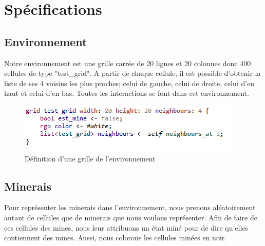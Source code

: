 \chapter{Spécifications}



\section{Environnement}

Notre environnement est une grille carrée de 20 lignes et 20 colonnes donc 400 cellules de type "test\_grid". A partir de chaque cellule, il est possible d'obtenir la liste de ses 4 voisins les plus proches; celui de gauche, celui de droite, celui d'en haut et celui d'en bas. Toutes les interactions se font dans cet environnement.\\

\begin{figure}[!h]
\begin{center}
\includegraphics{code/test_grid}
\end{center}
\caption{Définition d'une grille de l'environnement}
\end{figure}



\section{Minerais}

Pour représenter les minerais dans l'environnement, nous prenons aléatoirement autant de cellules que de minerais que nous voulons représenter. Afin de faire de ces cellules des mines, nous leur attribuons un état miné pour de dire qu'elles contiennent des mines. Aussi, nous colorons les cellules minées en noir.

